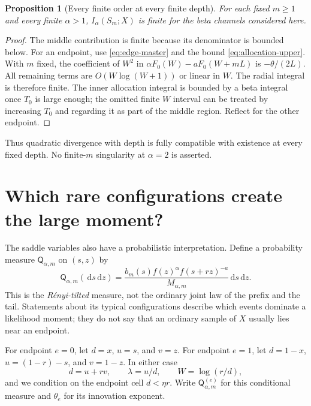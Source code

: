 \documentclass[11pt,a4paper]{article}
\numberwithin{equation}{section}
\newtheorem{proposition}[proposition]{Proposition}
\theoremstyle{definition}\newaliascnt{definition}{theorem}
\theoremstyle{remark}\newaliascnt{remark}{theorem}
\newcommand{\dd}{\,\mathrm d}
\begin{document}
\begin{proposition}[Every finite order at every finite depth]
\label{prop:finiteness}
For each fixed $m\ge1$ and every finite $\alpha>1$, $I_\alpha(S_m;X)$ is
finite for the beta channels considered here.
\end{proposition}
\begin{proof}
The middle contribution is finite because its denominator is bounded below.
For an endpoint, use \eqref{eq:edge-master} and the bound
\eqref{eq:allocation-upper}. With $m$ fixed, the coefficient of $W^2$ in
$\alpha F_0(W)-aF_0(W+mL)$ is $-\theta/(2L)$. All remaining terms are
$O(W\log(W+1))$ or linear in $W$. The radial integral is therefore finite.
The inner allocation integral is bounded by a beta integral once $T_0$ is
large enough; the omitted finite $W$ interval can be treated by increasing
$T_0$ and regarding it as part of the middle region. Reflect for the other
endpoint.
\end{proof}
Thus quadratic divergence with depth is fully compatible with existence
at every fixed depth. No finite-$m$ singularity at $\alpha=2$ is asserted.

\section{Which rare configurations create the large moment?}
\label{sec:tilt}
The saddle variables also have a probabilistic interpretation. Define a
probability measure $\mathsf Q_{\alpha,m}$ on $(s,z)$ by
\begin{equation}
 \mathsf Q_{\alpha,m}(\dd s\dd z)
 =\frac{b_m(s)f(z)^\alpha f(s+rz)^{-a}}{M_{\alpha,m}}
                          \dd s\dd z.
 \label{eq:tilted-measure}
\end{equation}
This is the \emph{R\'enyi-tilted} measure, not the ordinary joint law of the
prefix and the tail. Statements about its typical configurations describe
which events dominate a likelihood moment; they do not say that an ordinary
sample of $X$ usually lies near an endpoint.

For endpoint $e=0$, let
$d=x$, $u=s$, and $v=z$. For endpoint $e=1$, let
$d=1-x$, $u=(1-r)-s$, and $v=1-z$. In either case
\begin{equation}
 d=u+rv,\qquad \lambda=u/d,\qquad W=\log(r/d),
 \label{eq:deficit-coordinates}
\end{equation}
and we condition on the endpoint cell $d<\eta r$. Write
$\mathsf Q_{\alpha,m}^{(e)}$ for this conditional measure and
$\theta_e$ for its innovation exponent.
\end{document}
